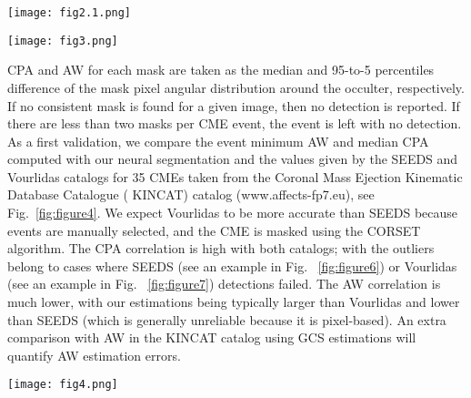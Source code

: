 \documentclass[baaa]{baaa}
\begin{document}
\begin{figure*}[!ht]
  \centering
  \texttt{[image: fig2.1.png]}
  \caption{Masks found in real \textit{LASCO C2} differential images acquired on 24 April 2013 at 06:59 UT (a) and 07:23 UT (b).  We show only masks with score $>$ 0.25.  The final selected masks are presented in panels (c) and (d). The corresponding rectangular bounding boxes are computed from the masks using the Python function \textsc{cv2.boundingRect()}. }
  \label{fig:figure2.1}
\end{figure*}

\begin{figure*}[!ht]
  \centering
  \texttt{[image: fig3.png]}
  \caption{\textit{SOHO}/\textit{LASCO} C2 24 April 2013 at 04:23 UT  showing the masks found for two CMEs }
  \label{fig:figure3}
\end{figure*}

CPA and AW for each mask are taken as the median and 95-to-5 percentiles difference of the mask pixel angular distribution around the occulter, respectively.  If no consistent mask is found for a given image, then no detection is reported. If there are less than two masks per CME event, the event is left with no detection.
As a first validation, we compare the event minimum AW and median CPA computed with our neural segmentation and the values given by the SEEDS and Vourlidas \citep{vourlidas2017} catalogs for 35 CMEs taken from the Coronal Mass Ejection Kinematic Database Catalogue (\textsc{ KINCAT}) catalog (www.affects-fp7.eu), see Fig.~\ref{fig:figure4}. We expect Vourlidas to be more accurate than SEEDS because events are manually selected, and the CME is masked using the CORSET algorithm. The CPA correlation is high with both catalogs; with the outliers belong to cases where SEEDS (see an example in Fig. ~\ref{fig:figure6}) or Vourlidas (see an example in Fig. ~\ref{fig:figure7}) detections failed. The AW correlation is much lower, with our estimations being typically larger than Vourlidas and lower than SEEDS (which is generally unreliable because it is pixel-based). An extra comparison with AW in the \textsc{KINCAT} catalog using GCS estimations will quantify AW estimation errors.

\begin{figure*}[!h]
  \centering
  \texttt{[image: fig4.png]}
  \caption{CPA (left) and AW (right) estimated with SEEDS and Vourlidas (see the legend) vs. our estimation (horizontal axis).  The outliers in CPA are shown in Figs. 5 to 8. }
  \label{fig:figure4}
\end{figure*}
\end{document}
